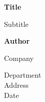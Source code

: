 \begin{titlepage}
   \begin{center}
       \vspace*{1cm}

       \textbf{\fontsize{40}{40}\selectfont Title}

       \vspace{0.5cm}
        Subtitle
            
       \vspace{1.5cm}

       \textbf{Author}

       \vfill
            
       Company 

       \vspace{0.8cm}
            
       Department\\
       Address\\
       Date
            
   \end{center}
\end{titlepage}

